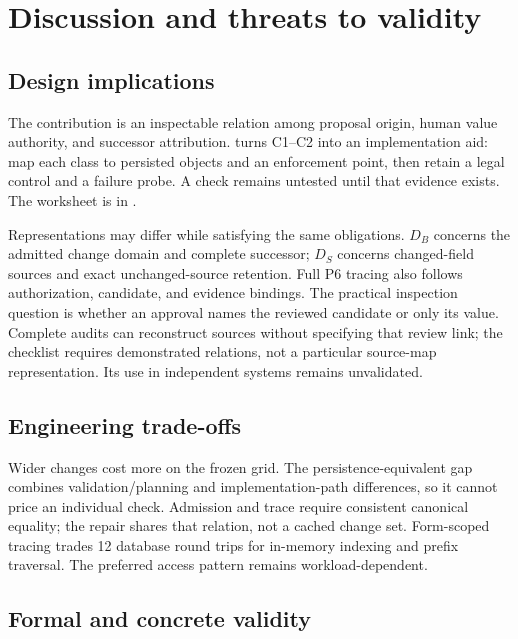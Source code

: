 \section{Discussion and threats to validity}
\label{sec:discussion}

\subsection{Design implications}

The contribution is an inspectable relation among proposal origin, human value authority, and successor attribution.  turns C1--C2 into an implementation aid: map each class to persisted objects and an enforcement point, then retain a legal control and a failure probe. A check remains untested until that evidence exists. The worksheet is in .



Representations may differ while satisfying the same obligations. $D_B$ concerns the admitted change domain and complete successor; $D_S$ concerns changed-field sources and exact unchanged-source retention. Full P6 tracing also follows authorization, candidate, and evidence bindings. The practical inspection question is whether an approval names the reviewed candidate or only its value. Complete audits can reconstruct sources without specifying that review link; the checklist requires demonstrated relations, not a particular source-map representation. Its use in independent systems remains unvalidated.

\subsection{Engineering trade-offs}

Wider changes cost more on the frozen grid. The persistence-equivalent gap combines validation/planning and implementation-path differences, so it cannot price an individual check. Admission and trace require consistent canonical equality; the repair shares that relation, not a cached change set. Form-scoped tracing trades 12 database round trips for in-memory indexing and prefix traversal. The preferred access pattern remains workload-dependent.

\subsection{Formal and concrete validity}

